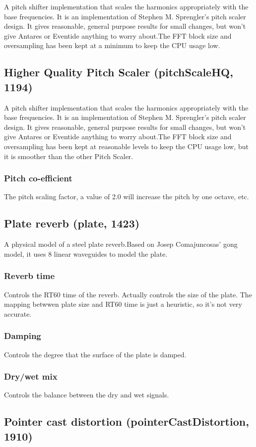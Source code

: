 \documentclass[11pt]{article}
\begin{document}
A pitch shifter implementation that scales the harmonics appropriately with the base frequencies. It is an implementation of Stephen M. Sprengler's pitch scaler design. It gives reasonable, general purpose results for small changes, but won't give Antares or Eventide anything to worry about.The FFT block size and oversampling has been kept at a minimum to keep the CPU usage low.\subsection{Higher Quality Pitch Scaler (pitchScaleHQ, 1194)\label{pitchScaleHQ}\label{id1194}}
A pitch shifter implementation that scales the harmonics appropriately with the base frequencies. It is an implementation of Stephen M. Sprengler's pitch scaler design. It gives reasonable, general purpose results for small changes, but won't give Antares or Eventide anything to worry about.The FFT block size and oversampling has been kept at reasonable levels to keep the CPU usage low, but it is smoother than the other Pitch Scaler.\subsubsection*{Pitch co-efficient}
The pitch scaling factor, a value of 2.0 will increase the pitch by one octave, etc.\subsection{Plate reverb (plate, 1423)\label{plate}\label{id1423}}
A physical model of a steel plate reverb.Based on Josep Comajuncosas' gong model, it uses 8 linear waveguides to model the plate.\subsubsection*{Reverb time}
Controls the RT60 time of the reverb. Actually controls the size of the plate. The mapping betwwen plate size and RT60 time is just a heuristic, so it's not very accurate.\subsubsection*{Damping}
Controls the degree that the surface of the plate is damped.\subsubsection*{Dry/wet mix}
Controls the balance between the dry and wet signals.\subsection{Pointer cast distortion (pointerCastDistortion, 1910)\label{pointerCastDistortion}\label{id1910}}
\end{document}
